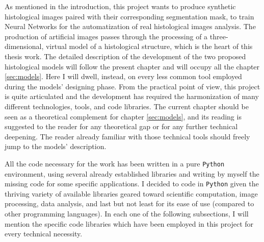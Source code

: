 As mentioned in the introduction, this project wants to produce synthetic histological images paired with their corresponding segmentation mask, to train Neural Networks for the automatization of real histological images analysis. The production of artificial images passes through the processing of a three-dimensional, virtual model of a histological structure, which is the heart of this thesis work. The detailed description of the development of the two proposed histological models will follow the present chapter and will occupy all the chapter \ref{sec:models}. Here I will dwell, instead, on every less common tool employed during the models' designing phase. From the practical point of view, this project is quite articulated and the development has required the harmonization of many different technologies, tools, and code libraries. The current chapter should be seen as a theoretical complement for chapter \ref{sec:models}, and its reading is suggested to the reader for any theoretical gap or for any further technical deepening. The reader already familiar with those technical tools should freely jump to the models' description.

All the code necessary for the work has been written in a pure \texttt{Python} environment, using several already established libraries and writing by myself the missing code for some specific applications. I decided to code in \texttt{Python} given the thriving variety of available libraries geared toward scientific computation, image processing, data analysis, and last but not least for its ease of use (compared to other programming languages). In each one of the following subsections, I will mention the specific code libraries which have been employed in this project for every technical necessity.
